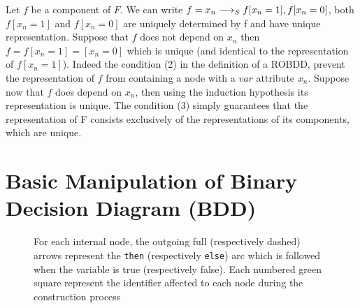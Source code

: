 \documentclass[a4paper,10pt]{article}
\newcommand{\includeframe}[4]{\makebox[#2\linewidth]{\texttt{[image: \#4]}}}
\begin{document}
Let $f$ be a component of $F$. We can write $f = x_n \longrightarrow_S f[x_n=1], f[x_n=0]$, both $f[x_n=1]$ and $f[x_n=0]$ are uniquely determined by f and have unique representation.
Suppose that $f$ does not depend on $x_n$ then $f=f[x_n=1]=[x_n=0]$ which is unique (and identical to the representation of $f[x_n=1]$).
Indeed the condition (2) in the definition of a ROBDD, prevent the representation of $f$ from containing a node with a $var$ attribute $x_n$.
Suppose now that $f$ does depend on $x_n$, then using the induction hypothesis its representation is unique.
The condition (3) simply guarantees that the representation of F consists exclusively of the representations of its components, which are unique.


\section{Basic Manipulation of Binary Decision Diagram (BDD)}


\begin{figure}
\centering
\includeframe{1}{1}{}{draws.pdf}
\caption{For each internal node, the outgoing full (respectively dashed) arrows represent the \texttt{then} (respectively \texttt{else}) arc which is followed when the variable is true (respectively false). Each numbered green square represent the identifier affected to each node during the construction process}
\label{draws1}
\end{figure}
\end{document}
